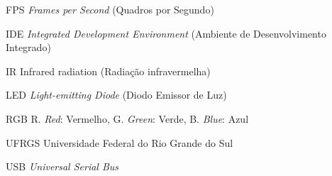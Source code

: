 %
%

\begin{siglas}
  \setlength{\baselineskip}{0.7\baselineskip}
  
  \item[FPS] \textit{Frames per Second} (Quadros por Segundo)
  \item[IDE] \textit{Integrated Development Environment} (Ambiente de Desenvolvimento Integrado)
  \item[IR] Infrared radiation (Radiação infravermelha)
  \item[LED] \textit{Light-emitting Diode} (Diodo Emissor de Luz)
  \item[RGB] R. \textit{Red}: Vermelho, G. \textit{Green}: Verde, B. \textit{Blue}: Azul
  \item[UFRGS] Universidade Federal do Rio Grande do Sul
  \item[USB] \textit{Universal Serial Bus}
\end{siglas}
